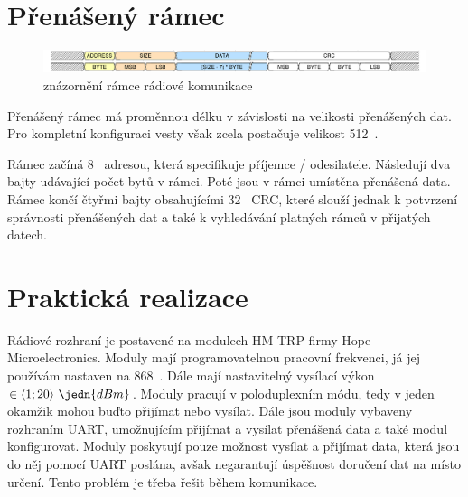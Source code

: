 \section{Přenášený rámec}
\begin{figure}[H]
    \begin{center}
        \includegraphics[width=\textwidth]{img/lgrf_packet}
    \end{center}
    \caption{znázornění rámce rádiové komunikace}
\end{figure}

Přenášený rámec má proměnnou délku v závislosti na velikosti přenášených dat. Pro kompletní konfiguraci vesty však zcela postačuje velikost 512~.

Rámec začíná 8~ adresou, která specifikuje příjemce / odesilatele. Následují dva bajty udávající počet bytů v rámci. Poté jsou v rámci umístěna přenášená data. Rámec končí čtyřmi bajty obsahujícími 32~ CRC, které slouží jednak k potvrzení správnosti přenášených dat a také k vyhledávání platných rámců v přijatých datech.

\section{Praktická realizace}
Rádiové rozhraní je postavené na modulech HM-TRP firmy Hope Microelectronics. Moduly mají programovatelnou pracovní frekvenci, já jej používám nastaven na 868~. Dále mají nastavitelný vysílací výkon $\in \langle 1; 20 \rangle~\jedn{dBm}$. Moduly pracují v poloduplexním módu, tedy v jeden okamžik mohou buďto přijímat nebo vysílat. Dále jsou moduly vybaveny rozhraním UART, umožnujícím přijímat a vysílat přenášená data a také modul konfigurovat. Moduly poskytují pouze možnost vysílat a přijímat data, která jsou do něj pomocí UART poslána, avšak negarantují úspěšnost doručení dat na místo určení. Tento problém je třeba řešit během komunikace.
